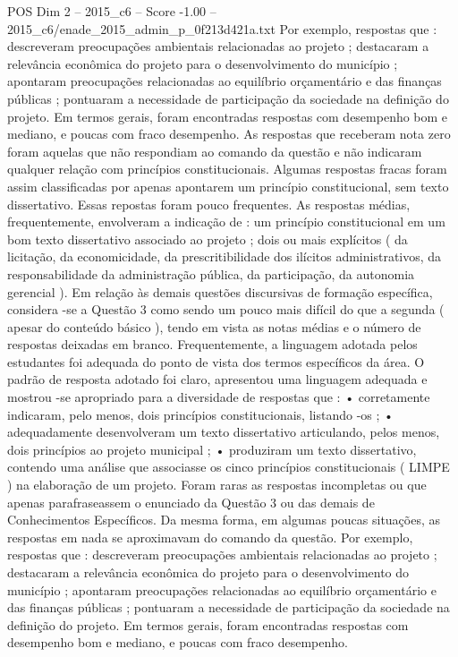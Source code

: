 \begin{textsample}{POS Dim 2 – 2015\_c6 – Score -1.00 – 2015\_c6/enade\_2015\_admin\_p\_0f213d421a.txt}
Por exemplo, respostas que : descreveram preocupações ambientais relacionadas ao projeto ; destacaram a relevância econômica do projeto para o desenvolvimento do município ; apontaram preocupações relacionadas ao equilíbrio orçamentário e das finanças públicas ; pontuaram a necessidade de participação da sociedade na definição do projeto.
Em termos gerais, foram encontradas respostas com desempenho bom e mediano, e poucas com fraco desempenho.
As respostas que receberam nota zero foram aquelas que não respondiam ao comando da questão e não indicaram qualquer relação com princípios constitucionais.
Algumas respostas fracas foram assim classificadas por apenas apontarem um princípio constitucional, sem texto dissertativo.
Essas repostas foram pouco frequentes.
As respostas médias, frequentemente, envolveram a indicação de : um princípio constitucional em um bom texto dissertativo associado ao projeto ; dois ou mais explícitos ( da licitação, da economicidade, da prescritibilidade dos ilícitos administrativos, da responsabilidade da administração pública, da participação, da autonomia gerencial ).
Em relação às demais questões discursivas de formação específica, considera -se a Questão 3 como sendo um pouco mais difícil do que a segunda ( apesar do conteúdo básico ), tendo em vista as notas médias e o número de respostas deixadas em branco.
Frequentemente, a linguagem adotada pelos estudantes foi adequada do ponto de vista dos termos específicos da área.
O padrão de resposta adotado foi claro, apresentou uma linguagem adequada e mostrou -se apropriado para a diversidade de respostas que : • corretamente indicaram, pelo menos, dois princípios constitucionais, listando -os ; • adequadamente desenvolveram um texto dissertativo articulando, pelos menos, dois princípios ao projeto municipal ; • produziram um texto dissertativo, contendo uma análise que associasse os cinco princípios constitucionais ( LIMPE ) na elaboração de um projeto.
Foram raras as respostas incompletas ou que apenas parafraseassem o enunciado da Questão 3 ou das demais de Conhecimentos Específicos.
Da mesma forma, em algumas poucas situações, as respostas em nada se aproximavam do comando da questão.
Por exemplo, respostas que : descreveram preocupações ambientais relacionadas ao projeto ; destacaram a relevância econômica do projeto para o desenvolvimento do município ; apontaram preocupações relacionadas ao equilíbrio orçamentário e das finanças públicas ; pontuaram a necessidade de participação da sociedade na definição do projeto.
Em termos gerais, foram encontradas respostas com desempenho bom e mediano, e poucas com fraco desempenho.

\end{textsample}

